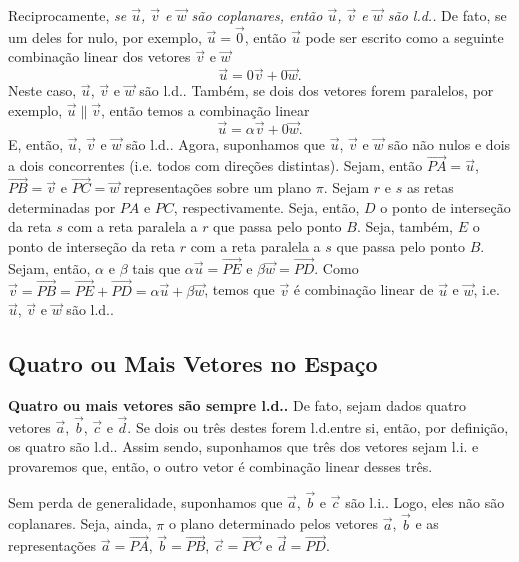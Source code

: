 Reciprocamente, \emph{se $\vec{u}$, $\vec{v}$ e $\vec{w}$ são coplanares, então $\vec{u}$, $\vec{v}$ e $\vec{w}$ são l.d..} De fato, se um deles for nulo, por exemplo, $\vec{u}=\vec{0}$, então $\vec{u}$ pode ser escrito como a seguinte combinação linear dos vetores $\vec{v}$ e $\vec{w}$
\begin{equation}
  \vec{u} = 0\vec{v} + 0\vec{w}.
\end{equation}
Neste caso, $\vec{u}$, $\vec{v}$ e $\vec{w}$ são l.d.. Também, se dois dos vetores forem paralelos, por exemplo, $\vec{u}\parallel\vec{v}$, então temos a combinação linear
\begin{equation}
  \vec{u} = \alpha\vec{v} + 0\vec{w}.
\end{equation}
E, então, $\vec{u}$, $\vec{v}$ e $\vec{w}$ são l.d.. Agora, suponhamos que $\vec{u}$, $\vec{v}$ e $\vec{w}$ são não nulos e dois a dois concorrentes (i.e. todos com direções distintas). Sejam, então $\overrightarrow{PA}=\vec{u}$, $\overrightarrow{PB}=\vec{v}$ e $\overrightarrow{PC}=\vec{w}$ representações sobre um plano $\pi$. Sejam $r$ e $s$ as retas determinadas por $PA$ e $PC$, respectivamente. Seja, então, $D$ o ponto de interseção da reta $s$ com a reta paralela a $r$ que passa pelo ponto $B$. Seja, também, $E$ o ponto de interseção da reta $r$ com a reta paralela a $s$ que passa pelo ponto $B$. Sejam, então, $\alpha$ e $\beta$ tais que $\alpha\vec{u}=\overrightarrow{PE}$ e $\beta\vec{w}=\overrightarrow{PD}$. Como $\vec{v} = \overrightarrow{PB} = \overrightarrow{PE} + \overrightarrow{PD} = \alpha\vec{u}+\beta\vec{w}$, temos que $\vec{v}$ é combinação linear de $\vec{u}$ e $\vec{w}$, i.e. $\vec{u}$, $\vec{v}$ e $\vec{w}$ são l.d..

\subsection{Quatro ou Mais Vetores no Espaço}

{\bf Quatro ou mais vetores são sempre l.d..} De fato, sejam dados quatro vetores $\vec{a}$, $\vec{b}$, $\vec{c}$ e $\vec{d}$. Se dois ou três destes forem l.d.entre si, então, por definição, os quatro são l.d.. Assim sendo, suponhamos que três dos vetores sejam l.i. e provaremos que, então, o outro vetor é combinação linear desses três.

Sem perda de generalidade, suponhamos que $\vec{a}$, $\vec{b}$ e $\vec{c}$ são l.i.. Logo, eles não são coplanares. Seja, ainda, $\pi$ o plano determinado pelos vetores $\vec{a}$, $\vec{b}$ e as representações $\vec{a}=\overrightarrow{PA}$, $\vec{b}=\overrightarrow{PB}$, $\vec{c}=\overrightarrow{PC}$ e $\vec{d}=\overrightarrow{PD}$.

